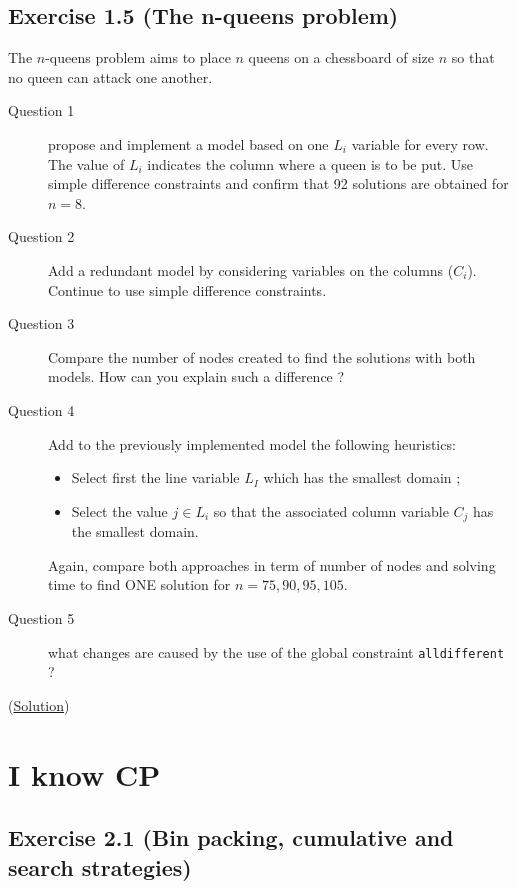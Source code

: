 \subsection{Exercise 1.5 (The n-queens problem)}\label{exercises:exercise1.5}\hypertarget{exercises:exercise1.5}{}
The $n$-queens problem aims to place $n$ queens on a chessboard of size $n$ so that no queen can attack one another.
\begin{description}
\item[Question 1] propose and implement a model based on one $L_{i}$ variable for every row. The value of $L_{i}$ indicates the column where a queen is to be put. Use simple difference constraints and confirm that 92 solutions are obtained for $n= 8$.
\item[Question 2] Add a redundant model by considering variables on the columns ($C_{i}$). Continue to use simple difference constraints.
\item[Question 3] Compare the number of nodes created to find the solutions with both models. How can you explain such a difference ?
\item[Question 4] Add to the previously implemented model the following heuristics:
  \begin{itemize}
  \item Select first the line variable $L_I$ which has the smallest domain ;
  \item Select the value $j\in L_i$ so that the associated column variable $C_j$ has the smallest domain.
  \end{itemize}
  Again, compare both approaches in term of number of nodes and solving time to find ONE solution for $n = 75, 90, 95, 105$.
\item[Question 5] what changes are caused by the use of the global constraint \texttt{alldifferent} ?
\end{description}


(\hyperlink{solutions:solutionofexercise1.5}{Solution})

\section{I know CP}\label{exercises:iknowcp}\hypertarget{exercises:iknowcp}{}

\subsection{Exercise 2.1 (Bin packing, cumulative and search strategies)}\label{exercises:exercise2.1}\hypertarget{exercises:exercise2.1}{}

